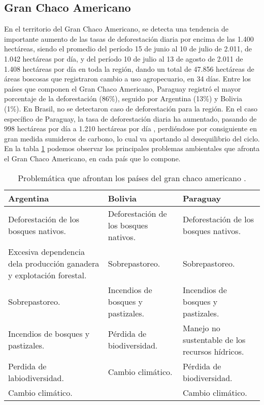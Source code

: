 \subsection{Gran Chaco Americano}
En el territorio del Gran Chaco Americano, se detecta una tendencia de importante aumento de las tasas de deforestaci\'on diaria por encima de las 1.400 hect\'areas, siendo el promedio del per\'iodo 15 de junio al 10 de julio de 2.011, de 1.042 hect\'areas por d\'ia, y del per\'iodo 10 de julio al 13 de agosto de 2.011 de 1.408 hect\'areas por d\'ia en toda la regi\'on, dando un total de 47.856 hect\'areas de \'areas boscosas que registraron cambio a uso agropecuario, en 34 d\'ias. Entre los pa\'ises que componen el Gran Chaco Americano,  Paraguay  registr\'o el mayor porcentaje de la deforestaci\'on (86\%), seguido por Argentina (13\%) y Bolivia (1\%). En Brasil, no se detectaron caso de deforestaci\'on para la regi\'on. En el caso espec\'ifico de Paraguay, la tasa de deforestaci\'on diaria ha aumentado, pasando de 998 hect\'areas por d\'ia a 1.210 hect\'areas por d\'ia \cite{fao2003revista}, perdi\'endose por consiguiente en gran medida sumideros de carbono, lo cual va aportando al desequilibrio del ciclo. En la tabla \ref{tab:chacoamericano} podemos observar los principales problemas ambientales que afronta el Gran Chaco Americano, en cada pa\'is que lo compone.
\begin{table}[!hbtp]
	\centering
	\caption{Problem\'atica que afrontan los países del gran chaco americano \cite{gustavo2012deteccion}.}
	\label{tab:chacoamericano}
	\begin{tabular}{|p{4cm}|p{4cm}|p{4cm}|}
		\hline
		{\bf Argentina} & {\bf Bolivia} & {\bf Paraguay} \\ \hline
		Deforestaci\'on de los bosques nativos. & Deforestaci\'on de los bosques nativos. & Deforestaci\'on de los bosques nativos. \\ \hline
		Excesiva dependencia dela producci\'on ganadera y explotaci\'on forestal. & Sobrepastoreo. & Sobrepastoreo. \\ \hline
		Sobrepastoreo. & Incendios de bosques y pastizales. & Incendios de bosques y pastizales. \\ \hline
		Incendios de bosques y pastizales. & P\'erdida de biodiversidad. & Manejo no sustentable de los recursos h\'idricos. \\ \hline
		Perdida de labiodiversidad. & Cambio clim\'atico. & P\'erdida de biodiversidad. \\ \hline
		Cambio clim\'atico. &  & Cambio clim\'atico. \\ \hline
	\end{tabular}
\end{table}


